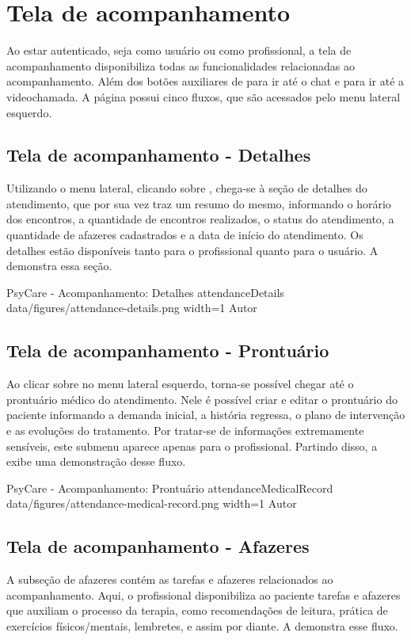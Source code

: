 \section{Tela de acompanhamento}
\label{sec:acompanhamento}

Ao estar autenticado, seja como usuário ou como profissional, a tela de acompanhamento disponibiliza todas as funcionalidades relacionadas ao acompanhamento. Além dos botões auxiliares de  para ir até o chat e  para ir até a videochamada. A página possui cinco fluxos, que são acessados pelo menu lateral esquerdo.

\subsection{Tela de acompanhamento - Detalhes}
\label{sec:acompanhamentoDetalhes}
Utilizando o menu lateral, clicando sobre , chega-se à seção de detalhes do atendimento, que por sua vez traz um resumo do mesmo, informando o horário dos encontros, a quantidade de encontros realizados, o status do atendimento, a quantidade de afazeres cadastrados e a data de início do atendimento. Os detalhes estão disponíveis tanto para o profissional quanto para o usuário. A  demonstra essa seção.

\image
    {PsyCare - Acompanhamento: Detalhes}
    {attendanceDetails}
    {data/figures/attendance-details.png}
    {width=1\textwidth}
    {Autor}

\subsection{Tela de acompanhamento - Prontuário}
\label{sec:acompanhamentoProntuario}
Ao clicar sobre  no menu lateral esquerdo, torna-se possível chegar até o prontuário médico do atendimento. Nele é possível criar e editar o prontuário do paciente informando a demanda inicial, a história regressa, o plano de intervenção e as evoluções do tratamento. Por tratar-se de informações extremamente sensíveis, este submenu aparece apenas para o profissional. Partindo disso, a  exibe uma demonstração desse fluxo.

\image
    {PsyCare - Acompanhamento: Prontuário}
    {attendanceMedicalRecord}
    {data/figures/attendance-medical-record.png}
    {width=1\textwidth}
    {Autor}

\subsection{Tela de acompanhamento - Afazeres}
\label{sec:acompanhamentoAfazeres}
A subseção de afazeres contém as tarefas e afazeres relacionados ao acompanhamento. Aqui, o profissional disponibiliza ao paciente tarefas e afazeres que auxiliam o processo da terapia, como recomendações de leitura, prática de exercícios físicos/mentais, lembretes, e assim por diante. A  demonstra esse fluxo.

